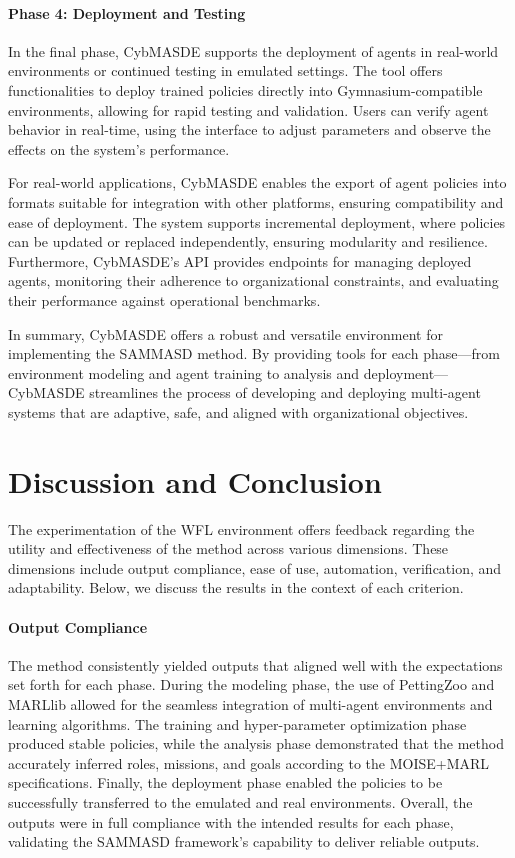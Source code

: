 \documentclass[sigconf,anonymous]{aamas}
\begin{document}
\paragraph{Phase 4: Deployment and Testing}

In the final phase, CybMASDE supports the deployment of agents in real-world environments or continued testing in emulated settings. The tool offers functionalities to deploy trained policies directly into Gymnasium-compatible environments, allowing for rapid testing and validation. Users can verify agent behavior in real-time, using the interface to adjust parameters and observe the effects on the system's performance.

For real-world applications, CybMASDE enables the export of agent policies into formats suitable for integration with other platforms, ensuring compatibility and ease of deployment. The system supports incremental deployment, where policies can be updated or replaced independently, ensuring modularity and resilience. Furthermore, CybMASDE’s API provides endpoints for managing deployed agents, monitoring their adherence to organizational constraints, and evaluating their performance against operational benchmarks.

In summary, CybMASDE offers a robust and versatile environment for implementing the SAMMASD method. By providing tools for each phase—from environment modeling and agent training to analysis and deployment—CybMASDE streamlines the process of developing and deploying multi-agent systems that are adaptive, safe, and aligned with organizational objectives.


\section{Discussion and Conclusion}
\label{sec:conclusion}

The experimentation of the WFL environment offers feedback regarding the utility and effectiveness of the method across various dimensions. These dimensions include output compliance, ease of use, automation, verification, and adaptability. Below, we discuss the results in the context of each criterion.

\paragraph{Output Compliance}

The method consistently yielded outputs that aligned well with the expectations set forth for each phase. During the modeling phase, the use of PettingZoo and MARLlib allowed for the seamless integration of multi-agent environments and learning algorithms. The training and hyper-parameter optimization phase produced stable policies, while the analysis phase demonstrated that the method accurately inferred roles, missions, and goals according to the MOISE+MARL specifications. Finally, the deployment phase enabled the policies to be successfully transferred to the emulated and real environments. Overall, the outputs were in full compliance with the intended results for each phase, validating the SAMMASD framework’s capability to deliver reliable outputs.
\end{document}
